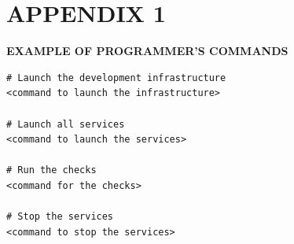 \documentclass[12pt,a4paper]{extarticle}
\begin{document}
\clearpage

\section*{APPENDIX 1}

\begin{center}
\textbf{EXAMPLE OF PROGRAMMER'S COMMANDS}
\end{center}

\begin{verbatim}
# Launch the development infrastructure
<command to launch the infrastructure>

# Launch all services
<command to launch the services>

# Run the checks
<command for the checks>

# Stop the services
<command to stop the services>
\end{verbatim}

\clearpage


\end{document}
